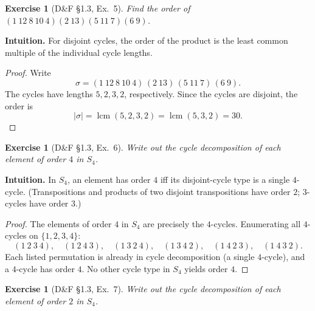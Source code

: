 \documentclass[12pt]{article}
\newtheorem{exercise}[theorem]{Exercise}
\theoremstyle{definition}
\begin{document}
\newpage

\begin{exercise}[D\&F §1.3, Ex.~5]
Find the order of $(1\ 12\ 8\ 10\ 4)(2\ 13)(5\ 11\ 7)(6\ 9)$.
\end{exercise}

\dotfill

\noindent
\textbf{Intuition.}
For disjoint cycles, the order of the product is the least common multiple of the individual
cycle lengths.

\dotfill

\begin{proof}
Write
\[
\sigma=(1\ 12\ 8\ 10\ 4)\,(2\ 13)\,(5\ 11\ 7)\,(6\ 9).
\]
The cycles have lengths $5,2,3,2$, respectively. Since the cycles are disjoint, the order is
\[
|\sigma|=\operatorname{lcm}(5,2,3,2)=\operatorname{lcm}(5,3,2)=30.
\]
\end{proof}

\newpage

\begin{exercise}[D\&F §1.3, Ex.~6]
Write out the cycle decomposition of each element of order $4$ in $S_{4}$.
\end{exercise}

\dotfill

\noindent
\textbf{Intuition.}
In $S_{4}$, an element has order $4$ iff its disjoint-cycle type is a single $4$-cycle.
(Transpositions and products of two disjoint transpositions have order $2$; $3$-cycles have order $3$.)

\dotfill

\begin{proof}
The elements of order $4$ in $S_{4}$ are precisely the $4$-cycles. Enumerating all $4$-cycles on $\{1,2,3,4\}$:
\[
(1\ 2\ 3\ 4),\quad
(1\ 2\ 4\ 3),\quad
(1\ 3\ 2\ 4),\quad
(1\ 3\ 4\ 2),\quad
(1\ 4\ 2\ 3),\quad
(1\ 4\ 3\ 2).
\]
Each listed permutation is already in cycle decomposition (a single $4$-cycle), and a $4$-cycle has order $4$.
No other cycle type in $S_{4}$ yields order $4$.
\end{proof}

\newpage

\begin{exercise}[D\&F §1.3, Ex.~7]
Write out the cycle decomposition of each element of order $2$ in $S_{4}$.
\end{exercise}

\dotfill
\end{document}
